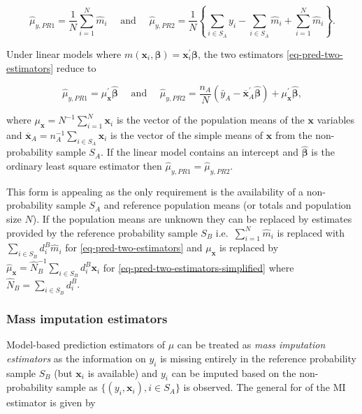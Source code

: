 \documentclass[
]{jss}
\begin{document}
\begin{equation}
\hat{\mu}_{y,PR1}=\frac{1}{N} \sum_{i=1}^N \hat{m}_i \quad \text { and } \quad \hat{\mu}_{y,PR2}=\frac{1}{N}\left\{\sum_{i \in S_A} y_i-\sum_{i \in S_A} \hat{m}_i+\sum_{i=1}^N \hat{m}_i\right\}.
\label{eq-pred-two-estimators}
\end{equation}

Under linear models where
\(m(\boldsymbol{x}_i, \boldsymbol{\beta})=\boldsymbol{x}_i^{\prime}\boldsymbol{\beta}\),
the two estimators \eqref{eq-pred-two-estimators} reduce to

\begin{equation}
\hat{\mu}_{y,PR1}=\mu_{\boldsymbol{x}}^{\prime} \hat{\boldsymbol{\beta}} \quad \text { and } \quad \hat{\mu}_{y,PR2}=\frac{n_A}{N}\left(\bar{y}_A-\overline{\boldsymbol{x}}_A^{\prime} \hat{\boldsymbol{\beta}}\right)+\mu_{\boldsymbol{x}}^{\prime} \hat{\boldsymbol{\beta}},
\label{eq-pred-two-estimators-simplified}
\end{equation}

where \(\mu_{\boldsymbol{x}} = N^{-1}\sum_{i=1}^N\boldsymbol{x}_i\) is
the vector of the population means of the \(\boldsymbol{x}\) variables
and
\(\overline{\boldsymbol{x}}_A=n_A^{-1}\sum_{i \in S_A}\boldsymbol{x}_i\)
is the vector of the simple means of \(\boldsymbol{x}\) from the
non-probability sample \(S_A\). If the linear model contains an
intercept and \(\hat{\boldsymbol{\beta}}\) is the ordinary least square
estimator then \(\hat{\mu}_{y,PR1}=\hat{\mu}_{y,PR2}\).

This form is appealing as the only requirement is the availability of a
non-probability sample \(S_A\) and reference population means (or totals
and population size \(N\)). If the population means are unknown they can
be replaced by estimates provided by the reference probability sample
\(S_B\) i.e.~\(\sum_{i=1}^N \hat{m}_i\) is replaced with
\(\sum_{i \in S_B} d_i^B\hat{m}_i\) for \eqref{eq-pred-two-estimators}
and \(\mu_{\boldsymbol{x}}\) is replaced by
\(\hat{\mu}_{\boldsymbol{x}}=\hat{N}_B^{-1}\sum_{i \in S_B}d_i^B\boldsymbol{x}_i\)
for \eqref{eq-pred-two-estimators-simplified} where
\(\hat{N}_B=\sum_{i \in S_B}d_i^B\).

\subsubsection{Mass imputation
estimators}\label{mass-imputation-estimators}

Model-based prediction estimators of \(\mu\) can be treated as
\textit{mass imputation estimators} as the information on \(y_i\) is
missing entirely in the reference probability sample \(S_B\) (but
\(\boldsymbol{x}_i\) is available) and \(y_i\) can be imputed based on
the non-probability sample as
\(\{ (y_i, \boldsymbol{x}_i), i \in S_A\}\) is observed. The general for
of the MI estimator is given by
\end{document}
